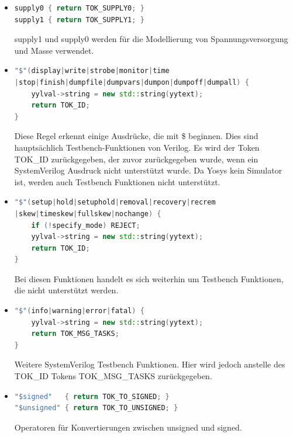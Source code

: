 \documentclass[11pt]{report}
\begin{document}
\begin{itemize}
\item
\begin{lstlisting}[language=C++]
supply0 { return TOK_SUPPLY0; }
supply1 { return TOK_SUPPLY1; }
\end{lstlisting}
supply1 und supply0 werden für die Modellierung von Spannungsversorgung und Masse verwendet.
\item
\begin{lstlisting}[language=C++]
"$"(display|write|strobe|monitor|time
|stop|finish|dumpfile|dumpvars|dumpon|dumpoff|dumpall) {
	yylval->string = new std::string(yytext);
	return TOK_ID;
}
\end{lstlisting}
Diese Regel erkennt einige Ausdrücke, die mit \$ beginnen. Dies sind hauptsächlich Testbench-Funktionen von Verilog. Es wird der Token TOK\_ID zurückgegeben, der zuvor zurückgegeben wurde, wenn ein SystemVerilog Ausdruck nicht unterstützt wurde. Da Yosys kein Simulator ist, werden auch Testbench Funktionen nicht unterstützt.



\item
\begin{lstlisting}[language=C++]
"$"(setup|hold|setuphold|removal|recovery|recrem
|skew|timeskew|fullskew|nochange) {
	if (!specify_mode) REJECT;
	yylval->string = new std::string(yytext);
	return TOK_ID;
}
\end{lstlisting}
Bei diesen Funktionen handelt es sich weiterhin um Testbench Funktionen, die nicht unterstützt werden.

\item
\begin{lstlisting}[language=C++]
"$"(info|warning|error|fatal) {
	yylval->string = new std::string(yytext);
	return TOK_MSG_TASKS;
}
\end{lstlisting}
Weitere SystemVerilog Testbench Funktionen. Hier wird jedoch anstelle des TOK\_ID Tokens TOK\_MSG\_TASKS zurückgegeben. 

\item
\begin{lstlisting}[language=C++]
"$signed"   { return TOK_TO_SIGNED; }
"$unsigned" { return TOK_TO_UNSIGNED; }
\end{lstlisting}
Operatoren für Konvertierungen zwischen unsigned und signed.


\end{itemize}
\end{document}
